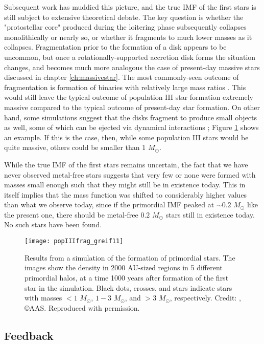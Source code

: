 Subsequent work has muddied this picture, and the true IMF of the first stars is still subject to extensive theoretical debate. The key question is whether the "protostellar core" produced during the loitering phase subsequently collapses monolithically or nearly so, or whether it fragments to much lower masses as it collapses. Fragmentation prior to the formation of a disk appears to be uncommon, but once a rotationally-supported accretion disk forms the situation changes, and becomes much more analogous the case of present-day massive stars discussed in chapter \ref{ch:massivestar}. The most commonly-seen outcome of fragmentation is formation of binaries with relatively large mass ratios \citep[e.g.,][]{stacy13a}. This would still leave the typical outcome of population III star formation extremely massive compared to the typical outcome of present-day star formation. On other hand, some simulations suggest that the disks fragment to produce small objects as well, some of which can be ejected via dynamical interactions \citep{clark11a, greif11a}; Figure \ref{fig:greif11a} shows an example. If this is the case, then, while some population III stars would be quite massive, others could be smaller than $1$ $M_\odot$.

While the true IMF of the first stars remains uncertain, the fact that we have never observed metal-free stars suggests that very few or none were formed with masses small enough such that they might still be in existence today. This in itself implies that the mass function was shifted to considerably higher values than what we observe today, since if the primordial IMF peaked at $\sim 0.2$ $M_\odot$ like the present one, there should be metal-free $0.2$ $M_\odot$ stars still in existence today. No such stars have been found.

\begin{figure}
\texttt{[image: popIIIfrag\_greif11]}
\caption[Disk fragmentation around a primordial star]{
\label{fig:greif11a}
Results from a simulation of the formation of primordial stars. The images show the density in 2000 AU-sized regions in 5 different primordial halos, at a time 1000 years after formation of the first star in the simulation. Black dots, crosses, and stars indicate stars with masses $<1$ $M_\odot$, $1-3$ $M_\odot$, and $>3$ $M_\odot$, respectively. Credit: \citet{greif11a}, \copyright AAS. Reproduced with permission.
}
\end{figure}


\subsection{Feedback}

